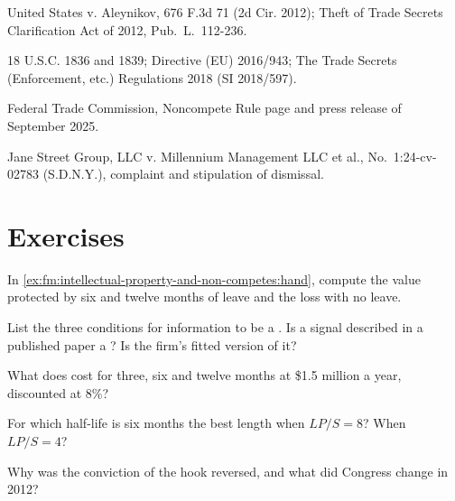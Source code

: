 \begin{omsources}
\item United States v. Aleynikov, 676 F.3d 71 (2d Cir. 2012); Theft of Trade Secrets Clarification Act of 2012, Pub.~L.~112-236.
\item 18 U.S.C. 1836 and 1839; Directive (EU) 2016/943; The Trade Secrets (Enforcement, etc.) Regulations 2018 (SI 2018/597).
\item Federal Trade Commission, Noncompete Rule page and press release of September 2025.
\item Jane Street Group, LLC v. Millennium Management LLC et al., No.~1:24-cv-02783 (S.D.N.Y.), complaint and stipulation of dismissal.
\end{omsources}

\section{Exercises}

\begin{exercise}[$\star$]\label{exo:fm:intellectual-property-and-non-competes:1}
In \cref{ex:fm:intellectual-property-and-non-competes:hand}, compute the value protected by six and twelve months of leave and the loss with no
leave.
\end{exercise}

\begin{exercise}[$\star$]\label{exo:fm:intellectual-property-and-non-competes:2}
List the three conditions for information to be a . Is a signal described in a published paper a ? Is the firm's fitted
version of it?
\end{exercise}

\begin{exercise}[$\star$]\label{exo:fm:intellectual-property-and-non-competes:3}
What does  cost for three, six and twelve months at \$1.5 million a year, discounted at 8\%?
\end{exercise}

\begin{exercise}[$\star\star$]\label{exo:fm:intellectual-property-and-non-competes:4}
For which half-life is six months the best length when $LP/S=8$? When $LP/S=4$?
\end{exercise}

\begin{exercise}[$\star\star$]\label{exo:fm:intellectual-property-and-non-competes:5}
Why was the conviction of the hook reversed, and what did Congress change in 2012?
\end{exercise}

